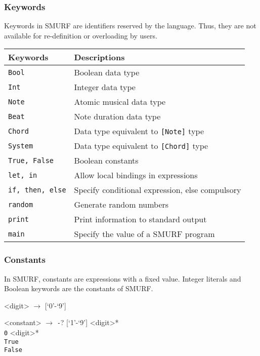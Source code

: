 \subsubsection{Keywords}
\label{sec:keywords}
Keywords in SMURF are identifiers reserved by the language. Thus, they are not available for
re-definition or overloading by users. 

\begin{table} [H]
	\centering
    \begin{tabular}{ll}
    \hline\hline
    Keywords & Descriptions \\ 
    \hline\hline
      \texttt{Bool} & Boolean data type \\ \hline
      \texttt{Int} & Integer data type \\ \hline
      \texttt{Note} & Atomic musical data type \\ \hline
      \texttt{Beat} & Note duration data type\\ \hline
      \texttt{Chord} & Data type equivalent to \texttt{[Note]} type \\ \hline
      \texttt{System} & Data type equivalent to \texttt{[Chord]} type \\ \hline
      \texttt{True, False} & Boolean constants \\ \hline
      \texttt{let, in} & Allow local bindings in expressions  \\ \hline
      \texttt{if, then, else} & Specify conditional expression, else compulsory  \\ \hline
      \texttt{random} & Generate random numbers \\ \hline
      \texttt{print} & Print information to standard output \\ \hline
      \texttt{main} & Specify the value of a SMURF program\\ \hline
    \end{tabular}
\end{table}


\subsubsection{Constants}
\label{sec:constants}
In SMURF, constants are expressions with a fixed value. Integer literals and
Boolean keywords are the constants of SMURF. 

\setlength{\grammarindent}{6em}
\begin{grammar}
<digit> $\rightarrow$ [`0'-`9'] 

<constant> $\rightarrow$ \texttt{-}? [`1'-`9'] <digit>* \\
												 \texttt{0} <digit>* \\
												\texttt{True} \\
												\texttt{False}
\end{grammar}

